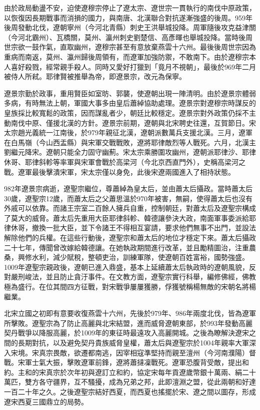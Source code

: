 由於政局動盪不安，迫使遼穆宗停止了遼太宗、遼世宗一貫執行的南伐中原政策，以恢復因長期戰事而消損的國力，與南唐、北漢聯合對抗遂漸強盛的後周。959年後周發動北伐，遼朝寧州（今河北青縣）刺史王洪舉城投降。周軍隨後攻克益津關（今河北霸州）、瓦橋關，莫州、瀛州刺史劉楚信、高彥暉也舉城投降。當時後周世宗欲一鼓作氣，直取幽州，遼穆宗甚至有意放棄燕雲十六州。最後後周世宗因為重病而南返，莫州、瀛州歸後周領有，而遼軍加強防禦，不敢南下。由於遼穆宗本人喜好殺戮，經常親手殺人。同時又愛好打獵到「竟月不視朝」，最後於969年二月被侍人所弒。耶律賢被推舉為帝，即遼景宗，改元為保寧。

遼景宗勤於政事，重用賢臣如室昉、郭襲，使遼朝出現一陣清明。由於遼景宗體弱多病，有時無法上朝，軍國大事多由皇后蕭綽協助處理。遼景宗對遼穆宗時謀反的皇族採比較寬鬆的政策，因而謀亂者少，朝廷比較穩定。遼景宗對外政策仍採不主動南伐中原、僅援北漢的方針。遼景宗前期，遼朝與北宋聘史往還，互賀節日。宋太宗趙光義統一江南後，於979年親征北漢，遼朝派數萬兵支援北漢。三月，遼軍在白馬嶺（今山西盂縣）與宋軍交戰戰敗，遼將耶律敵烈等人戰死。六月，北漢主劉繼元降宋。遼朝只能全力固守幽薊。宋太宗乘勝圍攻幽州，遼朝派耶律沙、耶律休哥、耶律斜軫等率軍與宋軍會戰於高梁河（今北京西直門外），史稱高梁河之戰。遼軍最後擊潰宋軍，宋太宗僅以身免，此後宋遼兩國進入了相持狀態。

982年遼景宗病逝，遼聖宗繼位，尊蕭綽為皇太后，並由蕭太后攝政。當時蕭太后30歲，遼聖宗12歲，而蕭太后之父蕭思溫於970年被害，無嗣，使得蕭太后也沒有外戚可以依靠。而諸王宗室二百餘人擁兵自重，控制朝廷，對蕭太后及遼聖宗構成了莫大的威脅。蕭太后先重用大臣耶律斜軫、韓德讓參決大政，南面軍事委派給耶律休哥，撤換一批大臣，並下令諸王不得相互宴請，要求他們無事不出門，並設法解除他們的兵權。在這些行動後，遼聖宗和蕭太后的地位才穩定下來。蕭太后攝政二十七年，傳聞曾改嫁給韓德讓。在她執政期間進行改革，並且勵精圖治，注重農桑，興修水利，減少賦稅，整頓吏治，訓練軍隊，使遼朝百姓富裕，國勢強盛。1009年遼聖宗親政後，遼朝已進入鼎盛，基本上延續蕭太后執政時的遼朝風貌，反對嚴刑峻法，並且防止貪汙事件。在文教方面，遼聖宗實行科舉，編修佛經，佛教極為盛行。在位其間四方征戰，對宋戰爭屢屢獲勝，俘獲號稱楊無敵的宋朝名將楊繼業。

北宋立國之初即有意要收復燕雲十六州，先後於979年、986年兩度北伐，皆為遼軍所擊敗。遼聖宗為了防止高麗與北宋結盟，進而威脅遼朝東部，於993年發動高麗契丹戰爭以降服高麗，於1009年的東征時最遠攻入高麗開城。之後為瞭解決遼宋之間的長期對抗，以及避免契丹貴族威脅皇權，蕭太后與遼聖宗於1004年親率大軍深入宋境。宋真宗畏敵，欲遷都南逃，因宰相寇準堅持而親至澶州（今河南濮陽）督戰。宋軍士氣大振，擊敗遼軍前鋒，遼將蕭撻凜戰死。遼軍恐腹背受敵，提出和約。主和的宋真宗於次年初與遼訂立和約，協定宋每年貢遼歲幣銀十萬兩、絹二十萬匹，雙方各守疆界，互不騷擾，成為兄弟之邦，此即澶淵之盟，從此兩朝和好達一百二十年之久。之後遼聖宗結好西夏，而西夏也搖擺於宋、遼之間以圖存，形成遼宋西夏三國鼎立的局勢。

